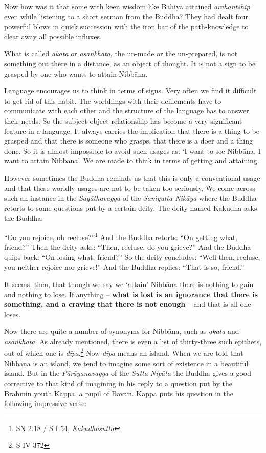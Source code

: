 Now how was it that some with keen wisdom like Bāhiya attained \emph{arahantship} even while listening to a short sermon from the Buddha? They had dealt four powerful blows in quick succession with the iron bar of the path-knowledge to clear away all possible influxes.

What is called \emph{akata} or \emph{asaṅkhata}, the un-made or the un-prepared, is not something out there in a distance, as an object of thought. It is not a sign to be grasped by one who wants to attain Nibbāna.

Language encourages us to think in terms of signs. Very often we find it difficult to get rid of this habit. The worldlings with their defilements have to communicate with each other and the structure of the language has to answer their needs. So the subject-object relationship has become a very significant feature in a language. It always carries the implication that there is a thing to be grasped and that there is someone who grasps, that there is a doer and a thing done. So it is almost impossible to avoid such usages as: `I want to see Nibbāna, I want to attain Nibbāna'. We are made to think in terms of getting and attaining.

However sometimes the Buddha reminds us that this is only a conventional usage and that these worldly usages are not to be taken too seriously. We come across such an instance in the \emph{Sagāthavagga} of the \emph{Saṁyutta Nikāya} where the Buddha retorts to some questions put by a certain deity. The deity named Kakudha asks the Buddha:

``Do you rejoice, oh recluse?''\footnote{\href{https://suttacentral.net/sn2.18/pli/ms}{SN 2.18 / S I 54}, \emph{Kakudhasutta}} And the Buddha retorts: ``On getting what, friend?'' Then the deity asks: ``Then, recluse, do you grieve?'' And the Buddha quips back: ``On losing what, friend?'' So the deity concludes: ``Well then, recluse, you neither rejoice nor grieve!'' And the Buddha replies: ``That is so, friend.''

It seems, then, that though we say we `attain' Nibbāna there is nothing to gain and nothing to lose. If anything -- \textbf{what is lost is an ignorance that there is something, and a craving that there is not enough} -- and that is all one loses.

Now there are quite a number of synonyms for Nibbāna, such as \emph{akata} and \emph{asaṅkhata}. As already mentioned, there is even a list of thirty-three such epithets, out of which one is \emph{dīpa}.\footnote{S IV 372} Now \emph{dīpa} means an island. When we are told that Nibbāna is an island, we tend to imagine some sort of existence in a beautiful island. But in the \emph{Pārāyanavagga} of the \emph{Sutta Nipāta} the Buddha gives a good corrective to that kind of imagining in his reply to a question put by the Brahmin youth Kappa, a pupil of Bāvarī. Kappa puts his question in the following impressive verse:

